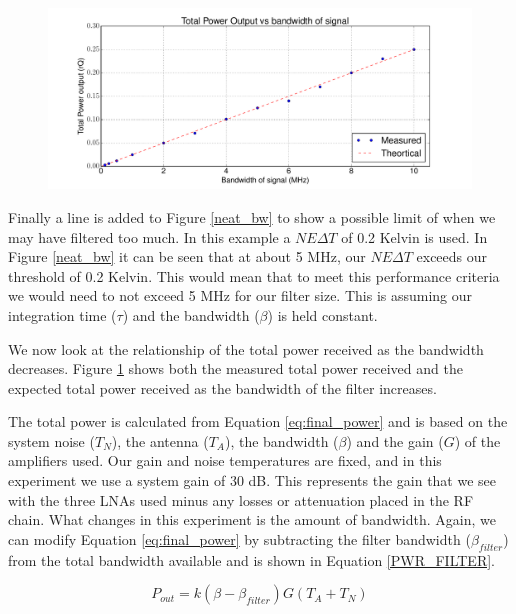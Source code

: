 \begin{figure}[h!tb] \centering
\includegraphics[width=\textwidth]{Experiments/Exp5/combined_plot.pdf}
\label{power_bw}
\end{figure}

Finally a line is added to Figure \ref{neat_bw} to show a possible limit of when we may have filtered too much.  In this example a $NE\Delta T$ of 0.2 Kelvin is used.  In Figure \ref{neat_bw} it can be seen that at about 5 MHz, our $NE\Delta T$ exceeds our threshold of 0.2 Kelvin.  This would mean that to meet this performance criteria we would need to not exceed 5 MHz for our filter size.  This is assuming our integration time ($\tau$) and the bandwidth ($\beta$) is held constant. 

We now look at the relationship of the total power received as the bandwidth decreases.  Figure \ref{power_bw} shows both the measured total power received and the expected total power received as the bandwidth of the filter increases.

The total power is calculated from Equation \ref{eq:final_power} and is based on the system noise ($T_N$), the antenna ($T_A$), the bandwidth ($\beta$) and the gain ($G$) of the amplifiers used.  Our gain and noise temperatures are fixed, and in this experiment we use a system gain of 30 dB.  This represents the gain that we see with the three LNAs used minus any losses or attenuation placed in the RF chain.  What changes in this experiment is the amount of bandwidth.  Again, we can modify Equation \ref{eq:final_power} by subtracting the filter bandwidth ($\beta_{filter}$) from the total bandwidth available and is shown in Equation \ref{PWR_FILTER}.

\begin{equation}\label{PWR_FILTER}
P_{out}=k (\beta - \beta_{filter})G(T_{A}+T_{N})
\end{equation}

